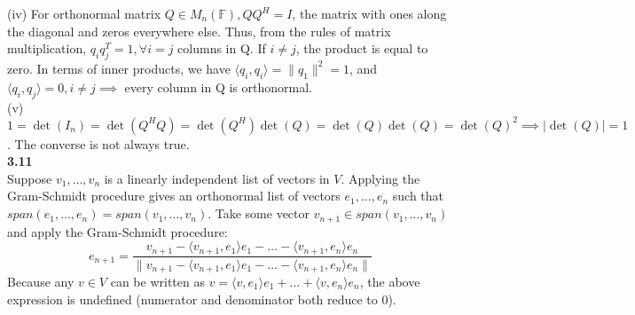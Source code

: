 \documentclass[letterpaper,12pt]{article}
\theoremstyle{definition}
\begin{document}
\noindent(iv) For orthonormal matrix $Q \in M_n(\mathbb{F}), QQ^H = I$, the matrix with ones along the diagonal and zeros everywhere else. Thus, from the rules of matrix multiplication, $q_iq_j^T = 1,  \forall i=j$ columns in Q. If $i \neq j$, the product is equal to zero. In terms of inner products, we have $\langle q_i, q_i \rangle = \|q_1\|^2 = 1$, and $\langle q_i, q_j \rangle = 0, i \neq j \implies$ every column in Q is orthonormal.\\

\noindent(v) $1 = \det(I_n) = \det(Q^HQ) = \det(Q^H)\det(Q) = \det(Q)\det(Q) = \det(Q)^2 \implies |\det(Q)| = 1$. The converse is not always true.\\

\noindent\textbf{3.11}\\
Suppose $v_1, \ldots , v_n$ is a linearly independent list of vectors in $V$. Applying the Gram-Schmidt procedure gives an orthonormal list of vectors $e_1, \ldots , e_n$ such that $span(e_1, \ldots ,e_n) = span(v_1, \ldots , v_n)$. Take some vector $v_{n+1} \in span(v_1, \ldots , v_n)$ and apply the Gram-Schmidt procedure:
\begin{equation*}
e_{n+1} = \frac{v_{n+1} - \langle v_{n+1}, e_1 \rangle e_1 - \ldots - \langle v_{n+1}, e_n \rangle e_n}{\| v_{n+1} - \langle v_{n+1}, e_1 \rangle e_1 - \ldots - \langle v_{n+1}, e_n \rangle e_n \|}
\end{equation*}
Because any $v \in V $ can be written as $v = \langle v, e_1 \rangle e_1 + \ldots + \langle v, e_n \rangle e_n$, the above expression is undefined (numerator and denominator both reduce to 0). \\
\end{document}
